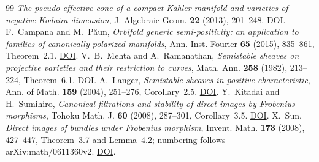 \documentclass[12pt,a4paper,psamsfonts]{amsart}
\theoremstyle{definition}
\theoremstyle{plain}
\begin{document}
\begin{thebibliography}{99}
\emph{The pseudo-effective cone of a compact K\"ahler manifold and
varieties of negative Kodaira dimension},
J. Algebraic Geom. \textbf{22} (2013), 201--248.
\href{https://doi.org/10.1090/S1056-3911-2012-00574-8}{DOI}.
F.~Campana and M.~P\u{a}un,
\emph{Orbifold generic semi-positivity: an application to families
of canonically polarized manifolds},
Ann. Inst. Fourier \textbf{65} (2015), 835--861, Theorem~2.1.
\href{https://doi.org/10.5802/aif.2945}{DOI}.
V.~B.~Mehta and A.~Ramanathan,
\emph{Semistable sheaves on projective varieties and their
restriction to curves},
Math. Ann. \textbf{258} (1982), 213--224, Theorem~6.1.
\href{https://doi.org/10.1007/BF01450677}{DOI}.
A.~Langer,
\emph{Semistable sheaves in positive characteristic},
Ann. of Math. \textbf{159} (2004), 251--276, Corollary~2.5.
\href{https://doi.org/10.4007/annals.2004.159.251}{DOI}.
Y.~Kitadai and H.~Sumihiro,
\emph{Canonical filtrations and stability of direct images by
Frobenius morphisms},
Tohoku Math. J. \textbf{60} (2008), 287--301, Corollary~3.5.
\href{https://doi.org/10.2748/tmj/1215442876}{DOI}.
X.~Sun,
\emph{Direct images of bundles under Frobenius morphism},
Invent. Math. \textbf{173} (2008), 427--447,
Theorem~3.7 and Lemma~4.2; numbering follows
arXiv:math/0611360v2.
\href{https://doi.org/10.1007/s00222-008-0125-y}{DOI}.
\end{thebibliography}
\end{document}
